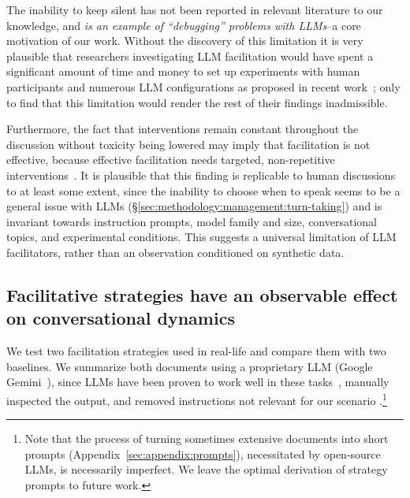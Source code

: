 The inability to keep silent has not been reported in relevant literature to our knowledge, and \emph{is an example of ``debugging'' problems with LLMs}--a core motivation of our work. Without the discovery of this limitation it is very plausible that researchers investigating LLM facilitation would have spent a significant amount of time and money to set up experiments with human participants and numerous LLM configurations as proposed in recent work~\cite{korre2025evaluation,small-polis-llm}; only to find that this limitation would render the rest of their findings inadmissible.

Furthermore, the fact that interventions remain constant throughout the discussion without toxicity being lowered may imply that facilitation is not effective, because effective facilitation needs targeted, non-repetitive interventions~\cite{chen-etal-2025-whow, park_et_al_2012_facilitation, schroeder-etal-2024-fora}. It is plausible that this finding is replicable to human discussions to at least some extent, since the inability to choose when to speak seems to be a general issue with LLMs (\S\ref{sec:methodology:management:turn-taking}) and is invariant towards instruction prompts, model family and size, conversational topics, and experimental conditions. This suggests a universal limitation of LLM facilitators, rather than an observation conditioned on synthetic data.


\subsection{Facilitative strategies have an observable effect on conversational dynamics}
\label{sec:facilitation:strategies}

We test two facilitation strategies used in real-life and compare them with two baselines. We summarize both documents using a proprietary LLM (Google Gemini~\cite{geminiteam2025}), since LLMs have been proven to work well in these tasks~\cite{ts2024}, manually inspected the output, and removed instructions not relevant for our scenario .\footnote{Note that the process of turning sometimes extensive documents into short prompts (Appendix~\ref{sec:appendix:prompts}), necessitated by open-source LLMs, is necessarily imperfect. We leave the optimal derivation of strategy prompts to future work.}

